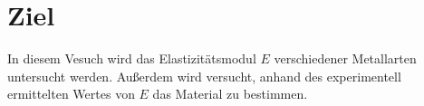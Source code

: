 \section{Ziel}
\label{sec:Ziel}

In diesem Vesuch wird das Elastizitätsmodul $E$ verschiedener Metallarten untersucht werden.
Außerdem wird versucht, anhand des experimentell ermittelten Wertes von $E$ das Material zu bestimmen.